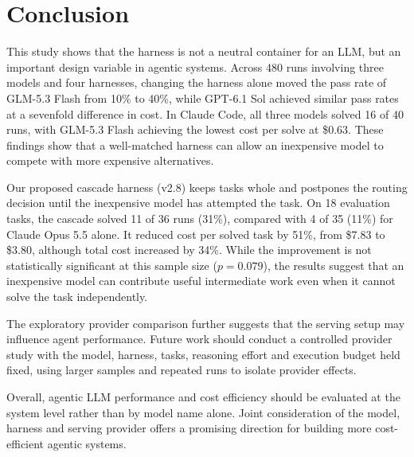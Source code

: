 \section{Conclusion}
\label{sec:conclusion}

This study shows that the harness is not a neutral container
for an LLM, but an important design variable in agentic
systems. Across 480 runs involving three models and four
harnesses, changing the harness alone moved the pass rate
of GLM-5.3 Flash from 10\% to 40\%, while GPT-6.1 Sol
achieved similar pass rates at a sevenfold difference in
cost. In Claude Code, all three models solved 16 of 40
runs, with GLM-5.3 Flash achieving the lowest cost per
solve at \$0.63. These findings show that a well-matched
harness can allow an inexpensive model to compete with
more expensive alternatives.

Our proposed cascade harness (v2.8) keeps tasks whole
and postpones the routing decision until the inexpensive
model has attempted the task. On 18 evaluation tasks,
the cascade solved 11 of 36 runs (31\%), compared with
4 of 35 (11\%) for Claude Opus 5.5 alone. It reduced
cost per solved task by 51\%, from \$7.83 to \$3.80,
although total cost increased by 34\%. While the
improvement is not statistically significant at this
sample size ($p = 0.079$), the results suggest that an
inexpensive model can contribute useful intermediate work
even when it cannot solve the task independently.

The exploratory provider comparison further suggests
that the serving setup may influence agent performance.
Future work should conduct a controlled provider study
with the model, harness, tasks, reasoning effort and
execution budget held fixed, using larger samples and
repeated runs to isolate provider effects.

Overall, agentic LLM performance and cost efficiency
should be evaluated at the system level rather than
by model name alone. Joint consideration of the model,
harness and serving provider offers a promising direction
for building more cost-efficient agentic systems.